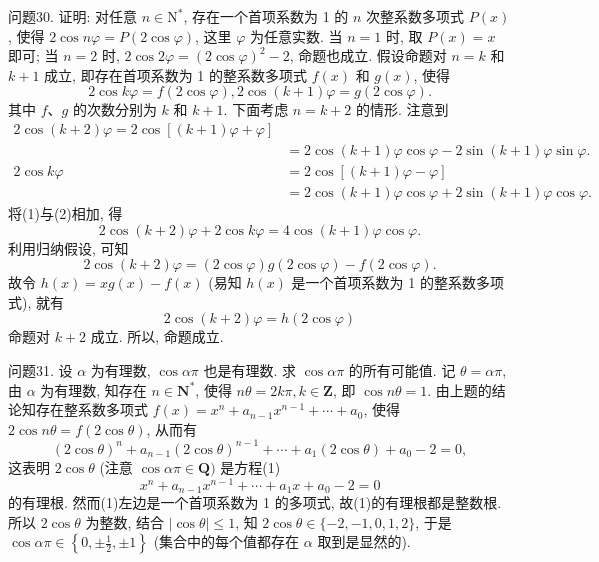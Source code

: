 问题30. 证明: 对任意 $n \in \mathrm{N}^*$, 存在一个首项系数为 1 的 $n$ 次整系数多项式 $P(x)$, 使得 $2 \cos n \varphi=P(2 \cos \varphi)$, 这里 $\varphi$ 为任意实数.
当 $n=1$ 时, 取 $P(x)=x$ 即可; 当 $n=2$ 时, $2 \cos 2 \varphi=(2 \cos \varphi)^2-2$, 命题也成立.
假设命题对 $n=k$ 和 $k+1$ 成立, 即存在首项系数为 1 的整系数多项式 $f(x)$ 和 $g(x)$, 使得
$$
2 \cos k \varphi=f(2 \cos \varphi), 2 \cos (k+1) \varphi=g(2 \cos \varphi) .
$$
其中 $f 、 g$ 的次数分别为 $k$ 和 $k+1$.
下面考虑 $n=k+2$ 的情形.
注意到
$$
\begin{aligned}
2 \cos (k+2) \varphi=2 \cos [(k+1) \varphi+\varphi] \\
& =2 \cos (k+1) \varphi \cos \varphi-2 \sin (k+1) \varphi \sin \varphi . \label{(1)}\\
2 \cos k \varphi & =2 \cos [(k+1) \varphi-\varphi] \\
& =2 \cos (k+1) \varphi \cos \varphi+2 \sin (k+1) \varphi \cos \varphi . \label{(2)}
\end{aligned}
$$
将(1)与(2)相加, 得
$$
2 \cos (k+2) \varphi+2 \cos k \varphi=4 \cos (k+1) \varphi \cos \varphi .
$$
利用归纳假设, 可知
$$
2 \cos (k+2) \varphi=(2 \cos \varphi) g(2 \cos \varphi)-f(2 \cos \varphi) .
$$
故令 $h(x)=x g(x)-f(x)$ (易知 $h(x)$ 是一个首项系数为 1 的整系数多项式), 就有
$$
2 \cos (k+2) \varphi=h(2 \cos \varphi)
$$
命题对 $k+2$ 成立.
所以, 命题成立.



问题31. 设 $\alpha$ 为有理数, $\cos \alpha \pi$ 也是有理数.
求 $\cos \alpha \pi$ 的所有可能值.
记 $\theta=\alpha \pi$, 由 $\alpha$ 为有理数, 知存在 $n \in \mathbf{N}^*$, 使得 $n \theta=2 k \pi, k \in \mathbf{Z}$, 即 $\cos n \theta=1$. 由上题的结论知存在整系数多项式 $f(x)=x^n+a_{n-1} x^{n-1}+\cdots+ a_0$, 使得 $2 \cos n \theta=f(2 \cos \theta)$, 从而有
$$
(2 \cos \theta)^n+a_{n-1}(2 \cos \theta)^{n-1}+\cdots+a_1(2 \cos \theta)+a_0-2=0,
$$
这表明 $2 \cos \theta$ (注意 $\cos \alpha \pi \in \mathbf{Q})$ 是方程(1)
$$
x^n+a_{n-1} x^{n-1}+\cdots+a_1 x+a_0-2=0
$$
的有理根.
然而(1)左边是一个首项系数为 1 的多项式, 故(1)的有理根都是整数根.
所以 $2 \cos \theta$ 为整数, 结合 $|\cos \theta| \leqslant 1$, 知 $2 \cos \theta \in\{-2,-1,0,1,2\}$, 于是 $\cos \alpha \pi \in\left\{0, \pm \frac{1}{2}, \pm 1\right\}$ (集合中的每个值都存在 $\alpha$ 取到是显然的).



